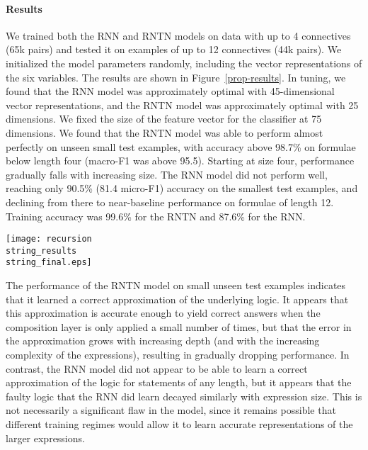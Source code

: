 \paragraph{Results} 
We trained both the RNN and RNTN models on data with up to 4
connectives (65k pairs) and tested it on examples of up to 12
connectives (44k pairs). We initialized the model parameters randomly,
including the vector representations of the six variables. The results
are shown in Figure~\ref{prop-results}. In tuning, we found that the
RNN model was approximately optimal with 45-dimensional vector
representations, and the RNTN model was approximately optimal with 25
dimensions. We fixed the size of the feature vector for the classifier
at 75 dimensions. We found that the RNTN model was able to perform
almost perfectly on unseen small test examples, with accuracy above
98.7\% on formulae below length four (macro-F1 was above 95.5).
Starting at size four, performance gradually falls with increasing
size.  The RNN model did not perform well, reaching only 90.5\% (81.4
micro-F1) accuracy on the smallest test examples, and declining from
there to near-baseline performance on formulae of length 12. Training
accuracy was 99.6\% for the RNTN and 87.6\% for the RNN.


\begin{figure*}[t]
  \centering
  \texttt{[image: recursion\\string\_results\\string\_final.eps]}
  \caption{Model performance on propositional logic, by expression size. 
    }  
  \label{prop-results}
\end{figure*}

The performance of the RNTN model on small unseen test examples
indicates that it learned a correct approximation of the underlying
logic. It appears that this approximation is accurate enough to yield
correct answers when the composition layer is only applied a small
number of times, but that the error in the approximation grows with
increasing depth (and with the increasing complexity of the
expressions), resulting in gradually dropping performance. In
contrast, the RNN model did not appear to be able to learn a correct
approximation of the logic for statements of any length, but it
appears that the faulty logic that the RNN did learn decayed similarly
with expression size.  This is not necessarily a significant flaw in the model, since it remains possible that  different training regimes would allow it to learn accurate representations of the larger expressions. 

